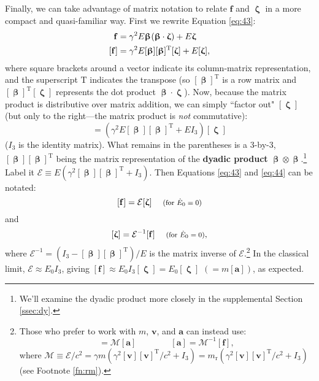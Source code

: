 \documentclass[12pt]{article}
\renewcommand{\vv}[1]{\mathbf{#1}}
\newcommand{\vvbeta}{\bm{\upbeta}}
\newcommand{\vvzeta}{\bm{\upzeta}}
\begin{document}
Finally, we can take advantage of matrix notation to relate $\vv f$ and $\vvzeta$ in a more compact and quasi-familiar way. First we rewrite Equation \ref{eq:43}:
\begin{equation*}
\begin{split}
\vv f &= \gamma^2 E \vvbeta \mkern1mu (\vvbeta \cdot \vvzeta) + E \vvzeta \\
[\vv f] &= \gamma^2 E [\vvbeta] [\vvbeta]^{\mathrm{T}} [\vvzeta] + E [\vvzeta] ,
\end{split}
\end{equation*}
where square brackets around a vector indicate its column-matrix representation, and the superscript $\mathrm{T}$ indicates the transpose (so $[\vvbeta]^{\mathrm{T}}$ is a row matrix and $[\vvbeta]^{\mathrm{T}} [\vvzeta]$ represents the dot product $\vvbeta \cdot \vvzeta$). Now, because the matrix product is distributive over matrix addition, we can simply ``factor out" $[\vvzeta]$ (but only to the right---the matrix product is \emph{not} commutative):
\begin{equation*}
[\vv f] = (\gamma^2 E [\vvbeta] [\vvbeta]^{\mathrm{T}} + E I_3) [\vvzeta]
\end{equation*}
($I_3$ is the identity matrix). What remains in the parentheses is a 3-by-3, $[\vvbeta] [\vvbeta]^{\mathrm{T}}$ being the matrix representation of the \textbf{dyadic product} $\vvbeta \otimes \vvbeta$.\footnote{We'll examine the dyadic product more closely in the supplemental Section \ref{ssec:dy}.} Label it $\mathcal{E} \equiv E(\gamma^2 [\vvbeta] [\vvbeta]^{\mathrm{T}} + I_3)$. Then Equations \ref{eq:43} and \ref{eq:44} can be notated:
\begin{equation}\label{eq:48}
[\vv f] = \mathcal{E} [\vvzeta] \quad \textrm{\footnotesize{ (for $\dot{E}_0 = 0$)}}
\end{equation}
and
\begin{equation}\label{eq:49}
[\vvzeta] = \mathcal{E}^{-1} [\vv f] \quad \textrm{\footnotesize{ (for $\dot{E}_0 = 0$)}},
\end{equation}
where $\mathcal{E}^{-1} = (I_3 - [\vvbeta] [\vvbeta]^{\mathrm{T}})/E$ is the matrix inverse of $\mathcal{E}$.\footnote{Those who prefer to work with $m$, $\vv v$, and $\vv a$ can instead use:
\begin{equation*}
[\vv f] = \mathcal{M} [\vv a] \qquad \qquad [\vv a] = \mathcal{M}^{-1} [\vv f],
\end{equation*}
where $\mathcal{M} \equiv \mathcal{E} / c^2 = \gamma m (\gamma^2 [\vv v] [\vv v]^{\mathrm{T}}/c^2 + I_3) =  m_{\textrm{r}}(\gamma^2 [\vv v] [\vv v]^{\mathrm{T}}/c^2 + I_3)$ (see Footnote \ref{fn:rm}).} In the classical limit, $\mathcal{E} \approx E_0 I_3$, giving $[\vv f] \approx E_0 I_3 [\vvzeta] = E_0 [\vvzeta]$ $(= m [\vv a])$, as expected.
\end{document}
